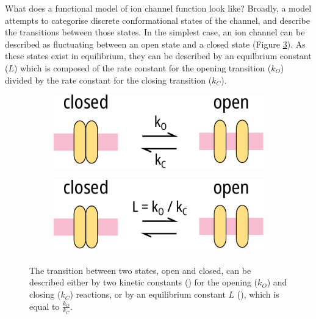 What does a functional model of ion channel function look like?
Broadly, a model attempts to categorise discrete conformational states of the channel, and describe the transitions between those states.
In the simplest case, an ion channel can be described as fluctuating between an open state and a closed state (Figure \ref{ch4fig:simple_model_diagram}).
As these states exist in equilibrium, they can be described by an equilbrium constant ($L$) which is composed of the rate constant for the opening transition ($k_O$) divided by the rate constant for the closing transition ($k_C$).

\begin{figure}[hbtp]
	\centering
	\begin{subfigure}[t]{0.45\textwidth}
		\caption{}\label{ch4fig:simple_diag_1}
		\centering
		\includegraphics[width=\textwidth]{model_introduction_diagrams.pdf}
	\end{subfigure}
	\hfill
	\begin{subfigure}[t]{0.45\textwidth}
		\caption{}\label{ch4fig:simple_diag_2}
		\centering
		\includegraphics[width=\textwidth]{model_introduction_diagrams_2.pdf}
	\end{subfigure}
	\caption[Simple ion channel model]{
	{\bf{}}
	The transition between two states, open and closed, can be described either by two kinetic constants () for the opening ($k_O$) and closing ($k_C$) reactions, or by an equilibrium constant $L$ (), which is equal to $\frac{k_O}{k_C}$.
	}\label{ch4fig:simple_model_diagram}
\end{figure}

